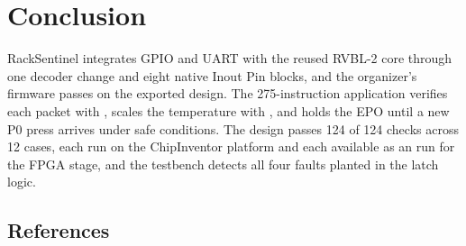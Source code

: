 \section{Conclusion}\label{sec:conclusion}
RackSentinel integrates GPIO and UART with the reused RVBL-2 core through one decoder change and eight native Inout Pin blocks, and the organizer's firmware passes on the exported design. The 275-instruction application verifies each packet with , scales the temperature with , and holds the EPO until a new P0 press arrives under safe conditions. The design passes 124 of 124 checks across 12 cases, each run on the ChipInventor platform and each available as an  run for the FPGA stage, and the testbench detects all four faults planted in the latch logic.

\subsection*{References}
{\renewcommand{\section}[2]{}%
 \sffamily\footnotesize\RaggedRight\setlength{\itemsep}{0pt}%
 }
